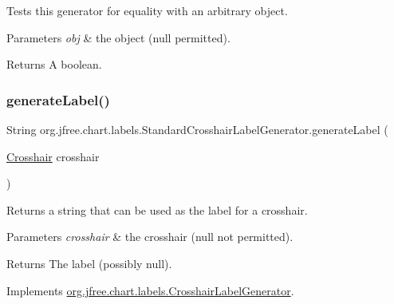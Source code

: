 Tests this generator for equality with an arbitrary object.


\begin{DoxyParams}{Parameters}
{\em obj} & the object ({\ttfamily null} permitted).\\
\hline
\end{DoxyParams}
\begin{DoxyReturn}{Returns}
A boolean. 
\end{DoxyReturn}
\mbox{\label{classorg_1_1jfree_1_1chart_1_1labels_1_1_standard_crosshair_label_generator_a85bf6b7d24554c7421f00887756f0a08}} 
\subsubsection{\texorpdfstring{generate\+Label()}{generateLabel()}}
{\footnotesize\ttfamily String org.\+jfree.\+chart.\+labels.\+Standard\+Crosshair\+Label\+Generator.\+generate\+Label (\begin{DoxyParamCaption}\item[{\mbox{\hyperlink{classorg_1_1jfree_1_1chart_1_1plot_1_1_crosshair}{Crosshair}}}]{crosshair }\end{DoxyParamCaption})}

Returns a string that can be used as the label for a crosshair.


\begin{DoxyParams}{Parameters}
{\em crosshair} & the crosshair ({\ttfamily null} not permitted).\\
\hline
\end{DoxyParams}
\begin{DoxyReturn}{Returns}
The label (possibly {\ttfamily null}). 
\end{DoxyReturn}


Implements \mbox{\hyperlink{interfaceorg_1_1jfree_1_1chart_1_1labels_1_1_crosshair_label_generator_a205b70df5a2ff8c21ee313208cc06f68}{org.\+jfree.\+chart.\+labels.\+Crosshair\+Label\+Generator}}.

\mbox{\label{classorg_1_1jfree_1_1chart_1_1labels_1_1_standard_crosshair_label_generator_a0809412006f50c42e83f01933cd127f9}} 
